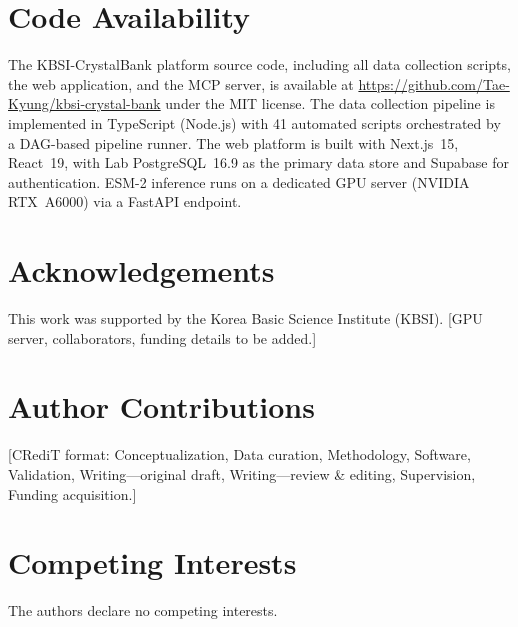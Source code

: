 \documentclass[11pt]{article}
\begin{document}
\section*{Code Availability}

The KBSI-CrystalBank platform source code, including all data collection scripts, the web application, and the MCP server, is available at \url{https://github.com/Tae-Kyung/kbsi-crystal-bank} under the MIT license. The data collection pipeline is implemented in TypeScript (Node.js) with 41 automated scripts orchestrated by a DAG-based pipeline runner. The web platform is built with Next.js~15, React~19, with Lab PostgreSQL~16.9 as the primary data store and Supabase for authentication. ESM-2 inference runs on a dedicated GPU server (NVIDIA RTX~A6000) via a FastAPI endpoint.

\section*{Acknowledgements}

This work was supported by the Korea Basic Science Institute (KBSI). [GPU server, collaborators, funding details to be added.]

\section*{Author Contributions}

[CRediT format: Conceptualization, Data curation, Methodology, Software, Validation, Writing---original draft, Writing---review \& editing, Supervision, Funding acquisition.]

\section*{Competing Interests}

The authors declare no competing interests.

\clearpage
\end{document}
